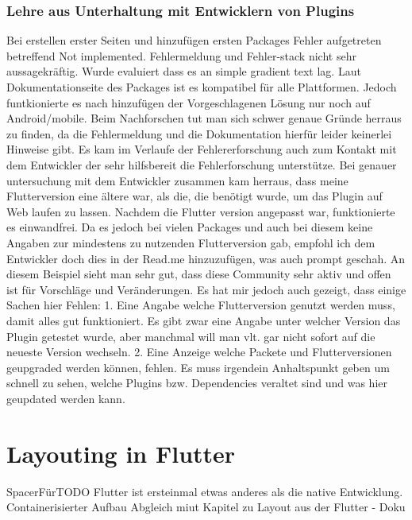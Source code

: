 \subsubsection{Lehre aus Unterhaltung mit Entwicklern von Plugins}
Bei erstellen erster Seiten und hinzufügen ersten Packages Fehler aufgetreten betreffend Not implemented. Fehlermeldung und Fehler-stack nicht sehr aussagekräftig. Wurde evaluiert dass es an simple gradient text lag. Laut Dokumentationseite des Packages ist es kompatibel für alle Plattformen. Jedoch funtkionierte es nach hinzufügen der Vorgeschlagenen Lösung nur noch auf Android/mobile. Beim Nachforschen tut man sich schwer genaue Gründe herraus zu finden, da die Fehlermeldung und die Dokumentation hierfür leider keinerlei Hinweise gibt. 
Es kam im Verlaufe der Fehlererforschung auch zum Kontakt mit dem Entwickler der sehr hilfsbereit die Fehlerforschung unterstütze.
Bei genauer untersuchung mit dem Entwickler zusammen kam herraus, dass meine Flutterversion eine ältere war, als die, die benötigt wurde, um das Plugin auf Web laufen zu lassen. Nachdem die Flutter version angepasst war, funktionierte es einwandfrei. Da es jedoch bei vielen Packages und auch bei diesem keine Angaben zur mindestens zu nutzenden Flutterversion gab, empfohl ich dem Entwickler doch dies in der Read.me hinzuzufügen, was auch prompt geschah. 
An diesem Beispiel sieht man sehr gut, dass diese Community sehr aktiv und offen ist für Vorschläge und Veränderungen.
Es hat mir jedoch auch gezeigt, dass einige Sachen hier Fehlen:
1. Eine Angabe welche Flutterversion genutzt werden muss, damit alles gut funktioniert. Es gibt zwar eine Angabe unter welcher Version das Plugin getestet wurde, aber manchmal will man vlt. gar nicht sofort auf die neueste Version wechseln.
2. Eine Anzeige welche Packete und Flutterversionen geupgraded werden können, fehlen. Es muss irgendein Anhaltspunkt geben um schnell zu sehen, welche Plugins bzw. Dependencies veraltet sind und was hier geupdated werden kann.


\section{Layouting in Flutter}
SpacerFürTODO
Flutter ist ersteinmal etwas anderes als die native Entwicklung. 
Containerisierter Aufbau Abgleich miut Kapitel zu Layout aus der Flutter - Doku

